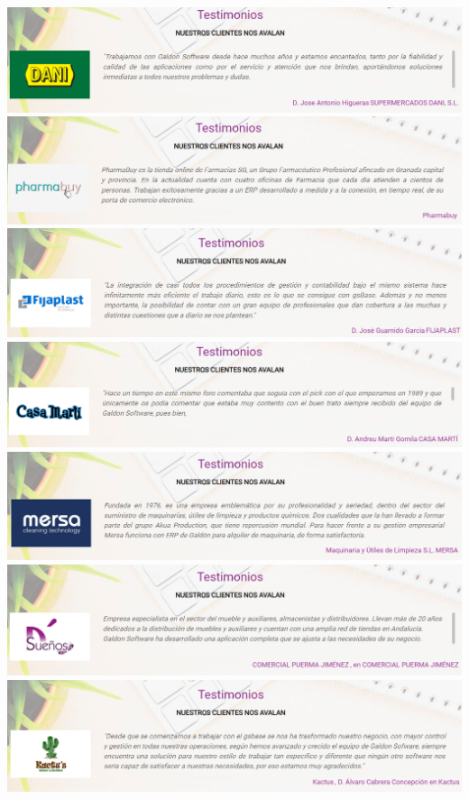 \documentclass{article}
\begin{document}
\begin{itemize}
\begin{flushleft}
	\includegraphics[scale=0.4]{imagenes/CapturasoftwareSaaS1o.png} 
	\includegraphics[scale=0.4]{imagenes/CapturasoftwareSaaS1p.png}
	\includegraphics[scale=0.4]{imagenes/CapturasoftwareSaaS1q.png}
	\includegraphics[scale=0.4]{imagenes/CapturasoftwareSaaS1r.png}
	\includegraphics[scale=0.4]{imagenes/CapturasoftwareSaaS1s.png}
	\includegraphics[scale=0.4]{imagenes/CapturasoftwareSaaS1t.png}
	\includegraphics[scale=0.4]{imagenes/CapturasoftwareSaaS1u.png}
\end{flushleft}	
	

\end{itemize}
\end{document}
